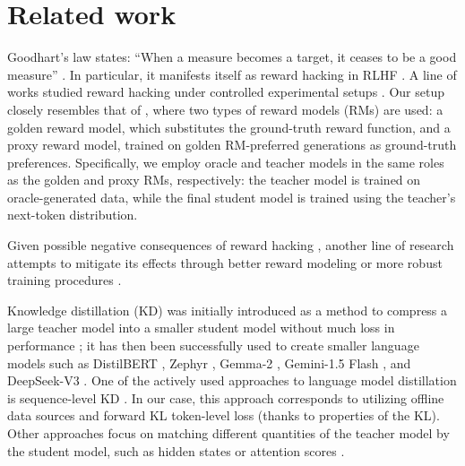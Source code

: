 \section{Related work}\label{sec:related_work}


Goodhart's law states: \enquote{When a measure becomes a target, it ceases to be a good measure} \cite{strathern1997improving}. In particular, it manifests itself as reward hacking in RLHF \cite{amodei2016concrete,gao2023scaling,weng2024rewardhack}. 
A line of works studied reward hacking under controlled experimental setups \cite{gao2023scaling,rafailov2024scaling}. 
Our setup closely resembles that of \citet{gao2023scaling}, where two types of reward models (RMs) are used: a golden reward model, which substitutes the ground-truth reward function, and a proxy reward model, trained on golden RM-preferred generations as ground-truth preferences. Specifically, we employ oracle and teacher models in the same roles as the golden and proxy RMs, respectively: the teacher model is trained on oracle-generated data, while the final student model is trained using the teacher's next-token distribution. 

Given possible negative consequences of reward hacking \cite{hendrycks2021unsolved,wen2024language}, another line of research attempts to mitigate its effects through better reward modeling or more robust training procedures \cite{chen2024odin,rame2024warm,liu2024rrm}.

Knowledge distillation (KD) was initially introduced as a method to compress a large teacher model into a smaller student model without much loss in performance \cite{buciluǎ2006model,hinton2015distilling}; it has then been successfully used to create smaller language models such as DistilBERT \cite{sanh2019distilbert},  Zephyr \cite{tunstall2023zephyr}, Gemma-2 \cite{team2024gemma}, Gemini-1.5 Flash \cite{team2024gemini}, and DeepSeek-V3 \cite{liu2024deepseek}. One of the actively used approaches to language model distillation is sequence-level KD \cite{kim2016sequence}. In our case, this approach corresponds to utilizing offline data sources and forward KL token-level loss (thanks to properties of the KL). Other approaches focus on matching different quantities of the teacher model by the student model, such as hidden states \cite{jiao2019tinybert} or attention scores \cite{wang2020minilm}.

